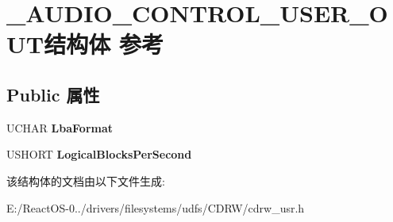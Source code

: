 \hypertarget{struct___a_u_d_i_o___c_o_n_t_r_o_l___u_s_e_r___o_u_t}{}\section{\+\_\+\+A\+U\+D\+I\+O\+\_\+\+C\+O\+N\+T\+R\+O\+L\+\_\+\+U\+S\+E\+R\+\_\+\+O\+U\+T结构体 参考}
\label{struct___a_u_d_i_o___c_o_n_t_r_o_l___u_s_e_r___o_u_t}
\subsection*{Public 属性}
\begin{DoxyCompactItemize}
\item 
\mbox{\label{struct___a_u_d_i_o___c_o_n_t_r_o_l___u_s_e_r___o_u_t_aaf96d180aab5ef738a82c029bf2ef268}} 
U\+C\+H\+AR {\bfseries Lba\+Format}
\item 
\mbox{\label{struct___a_u_d_i_o___c_o_n_t_r_o_l___u_s_e_r___o_u_t_a243d7ed73ba406c2922802c6240281e0}} 
U\+S\+H\+O\+RT {\bfseries Logical\+Blocks\+Per\+Second}
\end{DoxyCompactItemize}


该结构体的文档由以下文件生成\+:\begin{DoxyCompactItemize}
\item 
E\+:/\+React\+O\+S-\/0../drivers/filesystems/udfs/\+C\+D\+R\+W/cdrw\+\_\+usr.\+h\end{DoxyCompactItemize}
